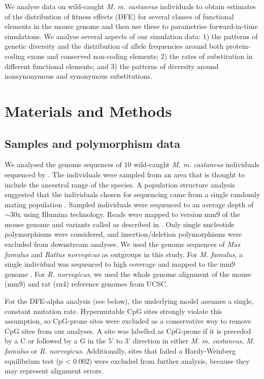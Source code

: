 	We analyse data on wild-caught \textit{M. m. castaneus} individuals to obtain estimates of the distribution of fitness effects (DFE) for several classes of functional elements in the mouse genome and then use these to parametrise forward-in-time simulations. We analyse several aspects of our simulation data: 1) the patterns of genetic diversity and the distribution of allele frequencies around both protein-coding exons and conserved non-coding elements; 2) the rates of substitution in different functional elements; and 3) the patterns of diversity around nonsynonymous and synonymous substitutions.
\section{Materials and Methods}

\subsection{Samples and polymorphism data}
 
	We analysed the genome sequences of 10 wild-caught \textit{M. m. castaneus} individuals sequenced by \cite{RN122}. The individuals were sampled from an area that is thought to include the ancestral range of the species\citep{RN233}. A population structure analysis suggested that the individuals chosen for sequencing came from a single randomly mating population \citep{RN158}. Sampled individuals were sequenced to an average depth of $\sim$30x using Illumina technology. Reads were mapped to version mm9 of the mouse genome and variants called as described in \cite{RN122}. Only single nucleotide polymorphisms were considered, and insertion/deletion polymorphisms were excluded from downstream analyses. We used the genome sequences of \textit{Mus famulus} and \textit{Rattus norvegicus} as outgroups in this study. For \textit{M. famulus}, a single individual was sequenced to high coverage and mapped to the mm9 genome \citep{RN122}. For \textit{R. norvegicus}, we used the whole genome alignment of the mouse (mm9) and rat (rn4) reference genomes from UCSC. 

	For the DFE-alpha analysis (see below), the underlying model assumes a single, constant mutation rate. Hypermutable CpG sites strongly violate this assumption, so CpG-prone sites were excluded as a conservative way to remove CpG sites from our analyses. A site was labelled as CpG-prone if it is preceded by a C or followed by a G in the 5’ to 3’ direction in either \textit{M. m. castaneus}, \textit{M. famulus} or \textit{R. norvegicus}. Additionally, sites that failed a Hardy-Weinberg equilibrium test (p < 0.002) were excluded from further analysis, because they may represent alignment errors.
 

